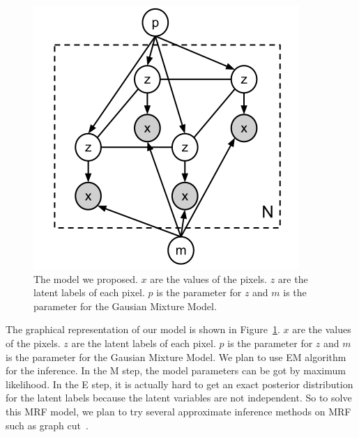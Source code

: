 \documentclass{article} %
\begin{document}
\begin{figure}[ht]
\begin{center}
\includegraphics[height=0.5\linewidth]{./fig/graphical_model.png}
\end{center}
\caption{The model we proposed.  $x$ are the values of the
pixels. $z$ are the latent labels of each pixel. $p$ is the parameter
for $z$ and $m$ is the parameter for the Gausian Mixture Model.}
\label{fig-graphical_model}
\end{figure}

The graphical representation of our model is shown in
Figure~\ref{fig-graphical_model}. $x$ are the values of the
pixels. $z$ are the latent labels of each pixel. $p$ is the parameter
for $z$ and $m$ is the parameter for the Gausian Mixture Model. We
plan to use EM algorithm for the inference. In the M step, the model
parameters can be got by maximum likelihood. In the E step, it is
actually hard to get an exact posterior distribution for the latent
labels because the latent variables are not independent. So to solve
this MRF model, we plan to try several approximate inference methods
on MRF such as graph cut~\citep{Boykov2006graph}.
\end{document}
